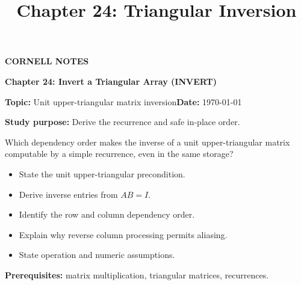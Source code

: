 \documentclass[10pt,letterpaper]{article}
\title{Chapter 24: Triangular Inversion}
\author{}
\date{}
\begin{document}
\maketitle
\begin{tcolorbox}[colback=Paper,colframe=Ink]{\small\bfseries\color{Teal}CORNELL NOTES}\par{\LARGE\bfseries Chapter 24: Invert a Triangular Array (INVERT)}\par\medskip\textbf{Topic:} Unit upper-triangular matrix inversion\hfill\textbf{Date:} \today\par\textbf{Study purpose:} Derive the recurrence and safe in-place order.\end{tcolorbox}
\begin{tcolorbox}[colback=Teal!5,colframe=Teal,title=Essential question]Which dependency order makes the inverse of a unit upper-triangular matrix computable by a simple recurrence, even in the same storage?\end{tcolorbox}
\begin{tcolorbox}[colback=white,colframe=Mist,title=Learning objectives]\begin{itemize}\item State the unit upper-triangular precondition.\item Derive inverse entries from $AB=I$.\item Identify the row and column dependency order.\item Explain why reverse column processing permits aliasing.\item State operation and numeric assumptions.\end{itemize}\textbf{Prerequisites:} matrix multiplication, triangular matrices, recurrences.\end{tcolorbox}
\end{document}
